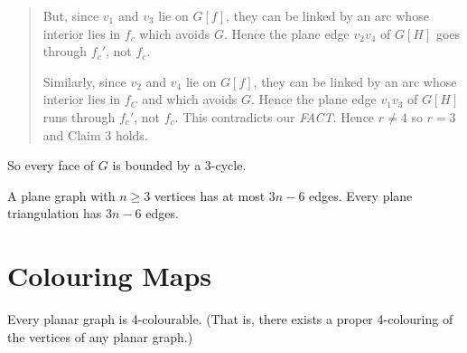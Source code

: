 \begin{proposition}
{\begin{quote}
            But, since \(v_1\) and \(v_3\) lie on \(G[f]\), they can be linked by an arc whose interior lies in \(f_c\) which avoids \(G\). Hence the plane edge \(v_2v_4\) of \(G[H]\) goes through \(f_c'\), not \(f_c\).

            Similarly, since \(v_2\) and \(v_4\) lie on \(G[f]\), they can be linked by an arc whose interior lies in \(f_C\) and which avoids \(G\). Hence the plane edge \(v_1 v_3\) of \(G[H]\) runs through \(f_c'\), not \(f_c\). This contradicts our \textit{FACT}. Hence \(r \neq 4\) so \(r = 3\) and Claim 3 holds.
        \end{quote}

        So every face of \(G\) is bounded by a 3-cycle.
    }
\end{proposition}

\begin{corollary} \label{coro-6.1.10}
    A plane graph with \(n \geq 3\) vertices has at most \(3n - 6\) edges. Every plane triangulation has \(3n - 6\) edges.
\end{corollary}

\section{Colouring Maps}

\begin{theorem}
    Every planar graph is 4-colourable. (That is, there exists a proper 4-colouring of the vertices of any planar graph.)
\end{theorem}

